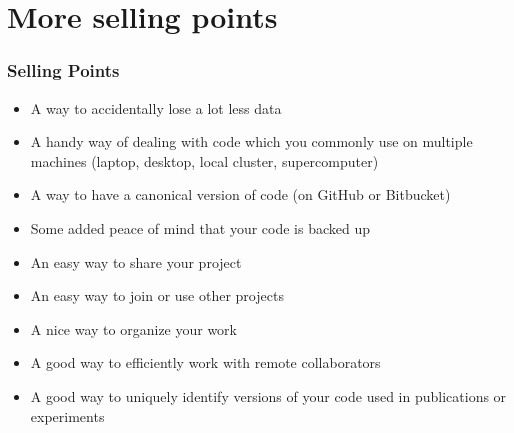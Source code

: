 \section{More selling points}
\begin{frame}[fragile]
\frametitle{Selling Points}
\begin{itemize}
\item A way to accidentally lose a lot less data
\item A handy way of dealing with code which you commonly use on multiple machines (laptop, desktop, local cluster, supercomputer)
\item A way to have a canonical version of code (on GitHub or Bitbucket)
\item Some added peace of mind that your code is backed up
\item An easy way to share your project
\item An easy way to join or use other projects
\item A nice way to organize your work
\item A good way to efficiently work with remote collaborators
\item A good way to uniquely identify versions of your code used in publications or experiments
\end{itemize}
\end{frame}

